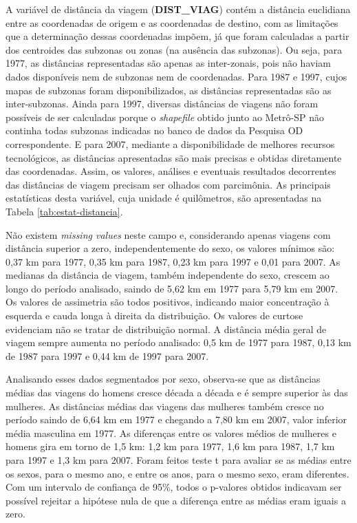 A variável de distância da viagem (\textbf{DIST_VIAG}) contém a distância euclidiana entre as coordenadas de origem e as coordenadas de destino, com as limitações que a determinação dessas coordenadas impõem, já que foram calculadas a partir dos centroides das subzonas ou zonas (na ausência das subzonas). Ou seja, para 1977, as distâncias representadas são apenas as inter-zonais, pois não haviam dados disponíveis nem de subzonas nem de coordenadas. Para 1987 e 1997, cujos mapas de subzonas foram disponibilizados, as distâncias representadas são as inter-subzonas. Ainda para 1997, diversas distâncias de viagens não foram possíveis de ser calculadas porque o \textit{shapefile} obtido junto ao Metrô-SP não continha todas subzonas indicadas no banco de dados da Pesquisa OD correspondente. E para 2007, mediante a disponibilidade de melhores recursos tecnológicos, as distâncias apresentadas são mais precisas e obtidas diretamente das coordenadas. Assim, os valores, análises e eventuais resultados decorrentes das distâncias de viagem precisam ser olhados com parcimônia. As principais estatísticas desta variável, cuja unidade é quilômetros, são apresentadas na Tabela \ref{tab:estat-distancia}.

Não existem \textit{missing values} neste campo e, considerando apenas viagens com distância superior a zero, independentemente do sexo, os valores mínimos são: 0,37 km para 1977, 0,35 km para 1987, 0,23 km para 1997 e 0,01 para 2007.
As medianas da distância de viagem, também independente do sexo, crescem ao longo do período analisado, saindo de 5,62 km em 1977 para 5,79 km em 2007.
Os valores de assimetria são todos positivos, indicando maior concentração à esquerda e cauda longa à direita da distribuição.
Os valores de curtose evidenciam não se tratar de distribuição normal.
A distância média geral de viagem sempre aumenta no período analisado: 0,5 km de 1977 para 1987, 0,13 km de 1987 para 1997 e 0,44 km de 1997 para 2007.

Analisando esses dados segmentados por sexo, observa-se que as distâncias médias das viagens do homens cresce década a década e é sempre superior às das mulheres.
As distâncias médias das viagens das mulheres também cresce no período saindo de 6,64 km em 1977 e chegando a 7,80 km em 2007, valor inferior média masculina em 1977.
As diferenças entre os valores médios de mulheres e homens gira em torno de 1,5 km: 1,2 km para 1977, 1,6 km para 1987, 1,7 km para 1997 e 1,3 km para 2007.
Foram feitos teste t para avaliar se as médias entre os sexos, para o mesmo ano, e entre os anos, para o mesmo sexo, eram diferentes. Com um intervalo de confiança de 95\%, todos o p-valores obtidos indicavam ser possível rejeitar a hipótese nula de que a diferença entre as médias eram iguais a zero.

